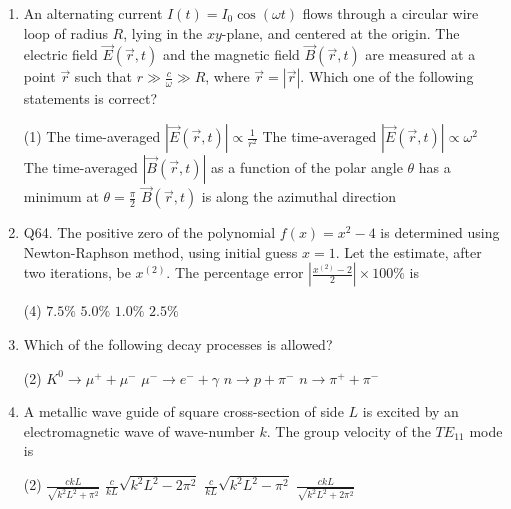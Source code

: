 \begin{enumerate}
 \begin{tasks}(4)
	\task[\textbf{a.}]$\pm 1$ and 0
	\task[\textbf{b.}]$\pm 1$
	\task[\textbf{c.}]$\pm 2$
	\task[\textbf{d.}]  $\pm 2$ and 0
\end{tasks}
\item An alternating current $I(t)=I_{0} \cos (\omega t)$ flows through a circular wire loop of radius $R$, lying in the $x y$-plane, and centered at the origin. The electric field $\vec{E}(\vec{r}, t)$ and the magnetic field $\vec{B}(\vec{r}, t)$ are measured at a point $\vec{r}$ such that $r \gg \frac{c}{\omega} \gg R$, where $\vec{r}=|\vec{r}|$.
Which one of the following statements is correct?
 \begin{tasks}(1)
	\task[\textbf{a.}] The time-averaged $|\vec{E}(\vec{r}, t)| \propto \frac{1}{r^{2}}$
	\task[\textbf{b.}] The time-averaged $|\vec{E}(\vec{r}, t)| \propto \omega^{2}$
	\task[\textbf{c.}] The time-averaged $|\vec{B}(\vec{r}, t)|$ as a function of the polar angle $\theta$ has a minimum at $\theta=\frac{\pi}{2}$
	\task[\textbf{d.}]$\vec{B}(\vec{r}, t)$ is along the azimuthal direction 
\end{tasks}
\item Q64. The positive zero of the polynomial $f(x)=x^{2}-4$ is determined using Newton-Raphson method, using initial guess $x=1$. Let the estimate, after two iterations, be $x^{(2)}$. The percentage error $\left|\frac{x^{(2)}-2}{2}\right| \times 100 \%$ is
 \begin{tasks}(4)
	\task[\textbf{a.}] $7.5 \%$
	\task[\textbf{b.}]$5.0 \%$
	\task[\textbf{c.}] $1.0 \%$
	\task[\textbf{d.}]  $2.5 \%$
\end{tasks}
\item Which of the following decay processes is allowed?
 \begin{tasks}(2)
	\task[\textbf{a.}]$K^{0} \rightarrow \mu^{+}+\mu^{-}$
	\task[\textbf{b.}] $\mu^{-} \rightarrow e^{-}+\gamma$
	\task[\textbf{c.}]$n \rightarrow p+\pi^{-}$
	\task[\textbf{d.}] $n \rightarrow \pi^{+}+\pi^{-}$
\end{tasks}
\item A metallic wave guide of square cross-section of side $L$ is excited by an electromagnetic wave of wave-number $k$. The group velocity of the $T E_{11}$ mode is
 \begin{tasks}(2)
	\task[\textbf{a.}]$\frac{c k L}{\sqrt{k^{2} L^{2}+\pi^{2}}}$
	\task[\textbf{b.}]$\frac{c}{k L} \sqrt{k^{2} L^{2}-2 \pi^{2}}$
	\task[\textbf{c.}]$\frac{c}{k L} \sqrt{k^{2} L^{2}-\pi^{2}}$
	\task[\textbf{d.}]  $\frac{c k L}{\sqrt{k^{2} L^{2}+2 \pi^{2}}}$

\end{tasks}
\end{enumerate}
